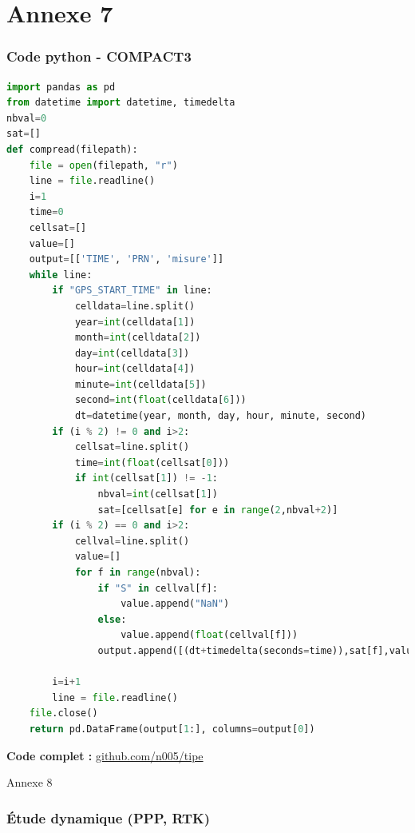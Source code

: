 \documentclass[xcolor=dvipsnames,envcountsect]{beamer}
\begin{document}
\section{Annexe 7}
\begin{frame}
	\frametitle{Code python - COMPACT3}
	\noindent
	\begin{lstlisting}[language=Python,basicstyle=\tiny]
import pandas as pd
from datetime import datetime, timedelta
nbval=0
sat=[]
def compread(filepath):
	file = open(filepath, "r")
	line = file.readline()
	i=1
	time=0
	cellsat=[]
	value=[]
	output=[['TIME', 'PRN', 'misure']]
	while line:
		if "GPS_START_TIME" in line:
			celldata=line.split()
			year=int(celldata[1])
			month=int(celldata[2])
			day=int(celldata[3])
			hour=int(celldata[4])
			minute=int(celldata[5])
			second=int(float(celldata[6]))
			dt=datetime(year, month, day, hour, minute, second)
		if (i % 2) != 0 and i>2:
			cellsat=line.split()
			time=int(float(cellsat[0]))
			if int(cellsat[1]) != -1:
				nbval=int(cellsat[1])
				sat=[cellsat[e] for e in range(2,nbval+2)]
		if (i % 2) == 0 and i>2:
			cellval=line.split()
			value=[]
			for f in range(nbval):
				if "S" in cellval[f]:
					value.append("NaN")
				else:
					value.append(float(cellval[f]))
				output.append([(dt+timedelta(seconds=time)),sat[f],value[f]])
		
		i=i+1
		line = file.readline()
	file.close()   
	return pd.DataFrame(output[1:], columns=output[0])
	\end{lstlisting}
	\textbf{Code complet :} \url{github.com/n005/tipe}
\end{frame}

\begin{frame}{Annexe 8}
	\frametitle{Étude dynamique (PPP, RTK)}
\end{frame}
\end{document}
